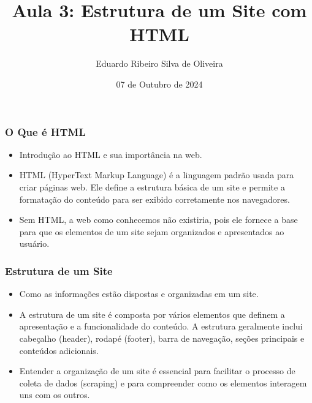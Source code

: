 \documentclass{beamer}
\title{Aula 3: Estrutura de um Site com HTML}
\author{Eduardo Ribeiro Silva de Oliveira}
\date{07 de Outubro de 2024}
\begin{document}
\frame{\titlepage}

\begin{frame}
  \frametitle{O Que é HTML}
  \begin{itemize}
    \item Introdução ao HTML e sua importância na web.
    \item HTML (HyperText Markup Language) é a linguagem padrão usada para criar páginas web. Ele define a estrutura básica de um site e permite a formatação do conteúdo para ser exibido corretamente nos navegadores.
    \item Sem HTML, a web como conhecemos não existiria, pois ele fornece a base para que os elementos de um site sejam organizados e apresentados ao usuário.
  \end{itemize}
\end{frame}

\begin{frame}
  \frametitle{Estrutura de um Site}
  \begin{itemize}
    \item Como as informações estão dispostas e organizadas em um site.
    \item A estrutura de um site é composta por vários elementos que definem a apresentação e a funcionalidade do conteúdo. A estrutura geralmente inclui cabeçalho (header), rodapé (footer), barra de navegação, seções principais e conteúdos adicionais.
    \item Entender a organização de um site é essencial para facilitar o processo de coleta de dados (scraping) e para compreender como os elementos interagem uns com os outros.
  \end{itemize}
\end{frame}
\end{document}
